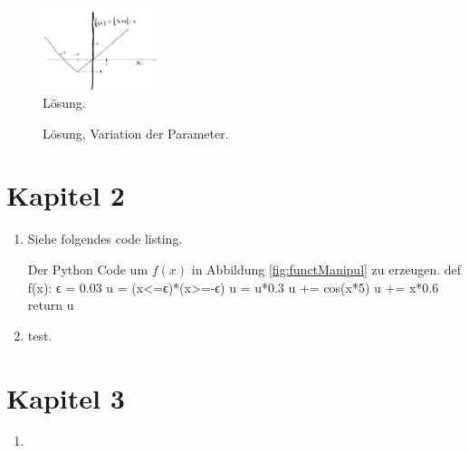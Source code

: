 \begin{figure}[h]
    \centering
    \includegraphics[width=0.3\textwidth]{img/loesung_abs.png}
    \caption{Lösung. }
    \label{fig:Loes_abs}
\end{figure}

\begin{figure}[h]
    \centering
    
    \caption{Lösung, Variation der Parameter.}
    \label{fig:Loes_abs_var}
\end{figure}



\section{Kapitel 2}
\begin{enumerate}
\item Siehe folgendes code listing.
\begin{python}{Der Python Code um $f(x)$ in Abbildung \ref{fig:functManipul} zu erzeugen.}
def f(x):
    ϵ = 0.03
    u = (x<=ϵ)*(x>=-ϵ)
    u = u*0.3
    u += cos(x*5)
    u += x*0.6
    return u

\end{python}
\item test.

\end{enumerate}

\section{Kapitel 3}
\begin{enumerate}
\item
\end{enumerate}

